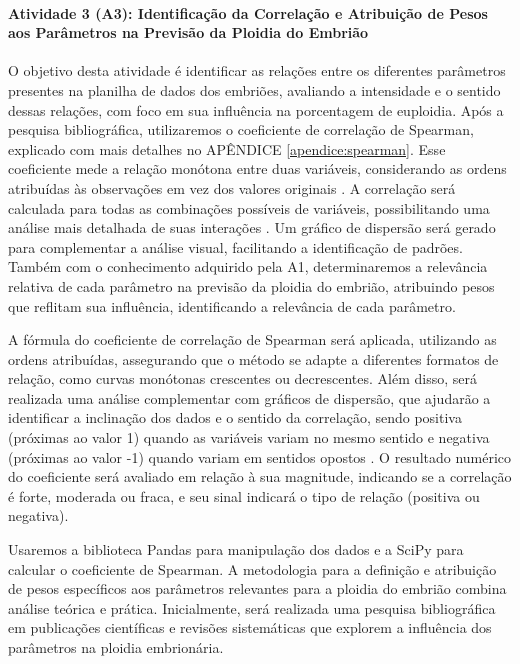 \paragraph{\textbf{Atividade 3 (A3):} Identificação da Correlação e Atribuição de Pesos aos Parâmetros na Previsão da Ploidia do Embrião}

O objetivo desta atividade é identificar as relações entre os diferentes parâmetros presentes na planilha de dados dos embriões, avaliando a intensidade e o sentido dessas relações, com foco em sua influência na porcentagem de euploidia. Após a pesquisa bibliográfica, utilizaremos o coeficiente de correlação de Spearman, explicado com mais detalhes no APÊNDICE \ref{apendice:spearman}. Esse coeficiente mede a relação monótona entre duas variáveis, considerando as ordens atribuídas às observações em vez dos valores originais \cite{sousa2019}. A correlação será calculada para todas as combinações possíveis de variáveis, possibilitando uma análise mais detalhada de suas interações \cite{sousa2019}. Um gráfico de dispersão será gerado para complementar a análise visual, facilitando a identificação de padrões. Também com o conhecimento adquirido pela A1, determinaremos a relevância relativa de cada parâmetro na previsão da ploidia do embrião, atribuindo pesos que reflitam sua influência, identificando a relevância de cada parâmetro.

A fórmula do coeficiente de correlação de Spearman será aplicada, utilizando as ordens atribuídas, assegurando que o método se adapte a diferentes formatos de relação, como curvas monótonas crescentes ou decrescentes. Além disso, será realizada uma análise complementar com gráficos de dispersão, que ajudarão a identificar a inclinação dos dados e o sentido da correlação, sendo positiva (próximas ao valor 1) quando as variáveis variam no mesmo sentido e negativa (próximas ao valor -1) quando variam em sentidos opostos \cite{sousa2019}. O resultado numérico do coeficiente será avaliado em relação à sua magnitude, indicando se a correlação é forte, moderada ou fraca, e seu sinal indicará o tipo de relação (positiva ou negativa). 

Usaremos a biblioteca Pandas para manipulação dos dados e a SciPy para calcular o coeficiente de Spearman. A metodologia para a definição e atribuição de pesos específicos aos parâmetros relevantes para a ploidia do embrião combina análise teórica e prática. Inicialmente, será realizada uma pesquisa bibliográfica em publicações científicas e revisões sistemáticas que explorem a influência dos parâmetros na ploidia embrionária.

